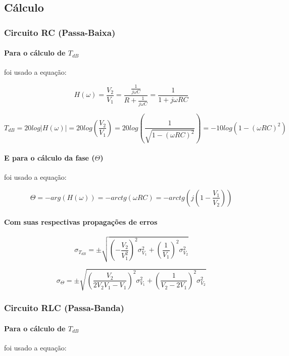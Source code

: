 \documentclass[a4paper]{article}
\begin{document}
\subsection{Cálculo}

\subsubsection{Circuito RC (Passa-Baixa)}

\paragraph{Para o cálculo de $T_{dB}$} foi usado a equação:

$$
	H(\omega) = 
	\frac{V_2}{V_1} = 
    \frac{\frac{1}{j\omega C}}{R + \frac{1}{j\omega C}} =
    \frac{1}{1 + j\omega R C}
$$

$$
	T_{dB} = 
    20 log|H(\omega)| = 
    20 log(\frac{V_2}{V_1}) = 
    20 log(\frac{1}{\sqrt{1 - (\omega R C)^2}}) = 
    -10 log(1 - (\omega R C)^2)
$$

\paragraph{E para o cálculo da fase ($\Theta$)} foi usado a equação:

$$
	\Theta =
    -arg(H(\omega)) =
    -arctg(\omega R C) = 
    -arctg(j(1 - \frac{V_1}{V_2})) 
$$

\paragraph{Com suas respectivas propagações de erros}

$$
	\sigma_{T_{dB}} = \pm
    \sqrt{
    	(-\frac{V_2}{V_1^2})^2 \sigma_{V_1}^2 +
    	(\frac{1}{V_1})^2 \sigma_{V_2}^2
    }
$$

$$
	\sigma_\Theta = \pm
    \sqrt{
    	(\frac{V_2}{2 V_2 V_1 - V_1})^2 \sigma_{V_1}^2 +
    	(\frac{1}{V_2 - 2 V_1})^2 \sigma_{V_2}^2 
    }
$$

\subsubsection{Circuito RLC (Passa-Banda)}

\paragraph{Para o cálculo de $T_{dB}$} foi usado a equação:
\end{document}
